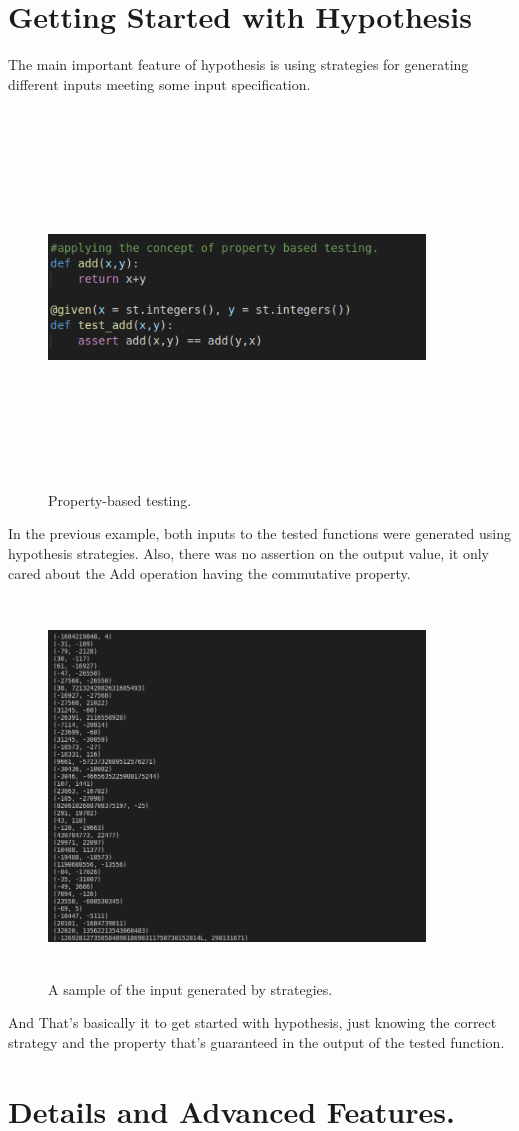 \documentclass[]{article}
\begin{document}
\section{{\large Getting Started with Hypothesis}}
The main important feature of hypothesis is using strategies for generating different inputs meeting some input specification.
\begin{figure}[H]
	\includegraphics[width=10cm,height=10cm,keepaspectratio]{testing_0.png}
	\caption{Property-based testing.}
	\label{fig 1: Property-based testing.}
\end{figure}
In the previous example, both inputs to the tested functions were generated using hypothesis strategies. Also, there was no assertion on the output value, it only cared about the Add operation having the commutative property.
\begin{figure}[H]
	\includegraphics[width=10cm,height=10cm,keepaspectratio]{testing_1.png}
	\caption{A sample of the input generated by strategies.}
	\label{fig 2: strategies' input.}
\end{figure}
And That's basically it to get started with hypothesis, just knowing the correct strategy and the property that's guaranteed in the output of the tested function.
 
\section{{\large Details and Advanced Features.}}
\end{document}

